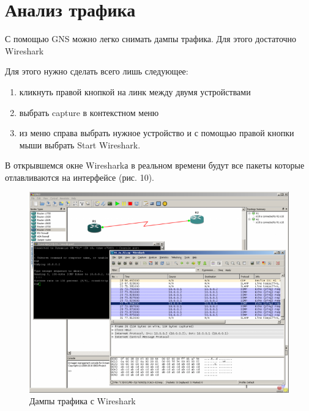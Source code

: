 \newpage
\section{Анализ трафика}

С помощью GNS можно легко снимать дампы трафика. Для этого достаточно Wireshark

Для этого нужно сделать всего лишь следующее:
\begin{enumerate}
\item кликнуть правой кнопкой на линк между двумя устройствами
\item выбрать capture в контекстном меню
\item из меню справа выбрать нужное устройство и с помощью правой кнопки мыши выбрать Start Wireshark.
\end{enumerate}

В открывшемся окне Wiresharkа в реальном времени будут все пакеты которые отлавливаются на интерфейсе (рис. 10).

\begin{figure}[h!]
\centering
\includegraphics[scale=0.7]{res/pic010}
\caption{Дампы трафика с Wireshark}
\end{figure}